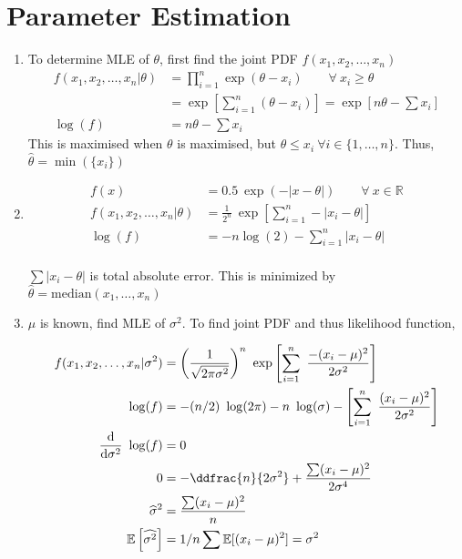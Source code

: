 \chapter{Parameter Estimation}

\begin{enumerate}
	
	\item 
		To determine MLE of $ \theta $, first find the joint PDF $ f(x_1, x_2, \dots, x_n) $ \\
		\begin{align}
			f(x_1, x_2, \dots, x_n | \theta) &= \prod_{i=1}^{n} \exp(\theta-x_i) \qquad \forall\ x_i \geq \theta \nonumber \\
			&= \exp \left[ \sum\limits_{i=1}^{n} (\theta - x_i) \right] = \exp \left[n\theta - \sum x_i\right] \nonumber \\
			\log (f) &= n\theta - \sum x_i		
		\end{align}
		This is maximised when $ \theta $ is maximised, but $ \theta \leq x_i\ \forall i \in \{1,\dots, n\} $.
		Thus, $ \widehat{\theta} = \min(\{x_i\}) $ \\
	
	
	\item 
		\begin{align}
			f(x) &= 0.5\ \exp\left(-|x- \theta|\right) \qquad \forall\ x \in \mathbb{R} \nonumber \\
			f(x_1, x_2, \dots, x_n | \theta) &= \frac{1}{2^n}\ \exp\left[ \sum\limits_{i=1}^{n} -|x_i - \theta| \right] \nonumber \\
			\log (f) &= -n\log (2) - \sum\limits_{i=1}^{n} |x_i - \theta| 
		\end{align}
	 \\
	
	
	$ \sum |x_i - \theta| $ is total absolute error. This is minimized by $ \widehat{\theta} = \mathrm{median}(x_1, \dots, x_n)$\\
	
	\item $ \mu $ is known, find MLE of $ \sigma^2 $. To find joint PDF and thus likelihood function,
	
	
		\begin{align}
			f(x_1, x_2, \dots, x_n | \sigma^2) &= \left(\frac{1}{\sqrt{2\pi\sigma^2}}\right)^n\ \exp \left[\sum\limits_{i=1}^{n}\ \frac{-(x_i - \mu)^2}{2\sigma^2}\right] \nonumber \\
			\log(f) &= -(n/2)\ \log(2\pi) - n\ \log(\sigma) - \left[\sum\limits_{i=1}^{n}\ \frac{(x_i - \mu)^2}{2\sigma^2}\right] \\
			\frac{\mathrm{d}}{\mathrm{d} \sigma^2}\ \log(f) &= 0 \nonumber \\
			0 &= -\ddfrac{n}{2\sigma^2} + \frac{\sum (x_i - \mu)^2}{2\sigma^4} \nonumber \\
			\widehat{\sigma}^2 &= \frac{\sum (x_i - \mu)^2}{n} \\
			\mathbb{E}\left[\widehat{\sigma^2}\right] &= 1/n \sum \mathbb{E}[(x_i - \mu)^2] = \sigma^2
		\end{align}
	

\end{enumerate}
